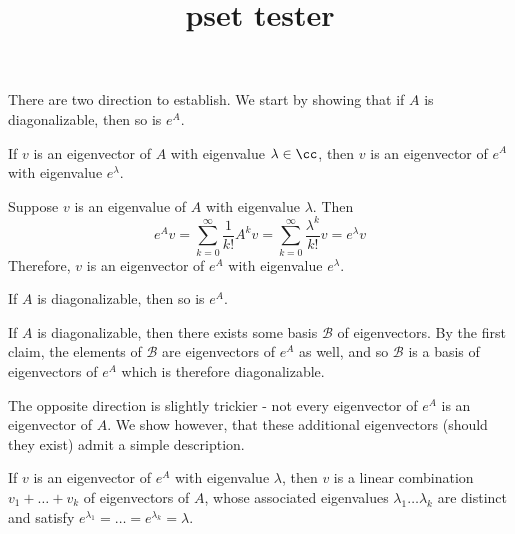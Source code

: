 \documentclass{scrartcl}
\title{pset tester}
\begin{document}
\maketitle


\newpset


\begin{solution} 
        There are two direction to establish. We start by showing that if $A$ is diagonalizable, then so is $e^A$.
        \begin{lemma}
        If $v$ is an eigenvector of $A$ with eigenvalue $\lambda\in \cc$, then $v$ is an eigenvector of $e^A$ with eigenvalue $e^\lambda$.
        \end{lemma}
        \begin{subproof}
        Suppose $v$ is an eigenvalue of $A$ with eigenvalue $\lambda$. Then 
        \[e^Av=\sum_{k=0}^{\infty}\frac{1}{k!}A^kv=\sum_{k=0}^{\infty}\frac{\lambda^k}{k!}v=e^\lambda v\]
        Therefore, $v$ is an eigenvector of $e^A$
         with eigenvalue $e^\lambda$.
         \end{subproof}
        
        \begin{lemma}
        If $A$ is diagonalizable, then so is $e^A$.
        \end{lemma}
        \begin{subproof}
        If $A$ is diagonalizable, then there exists some basis $\mathcal{B}$ of eigenvectors. By the first claim, the elements of $\mathcal{B}$ are eigenvectors of $e^A$ as well, and so $\mathcal{B}$ is a basis of eigenvectors of $e^A$ which is therefore diagonalizable.
        \end{subproof}
        
        The opposite direction is slightly trickier - not every eigenvector of $e^A$ is an eigenvector of $A$. We show however, that these additional eigenvectors (should they exist) admit a simple description. 
        
        \begin{lemma}
        If $v$ is an eigenvector of $e^A$ with eigenvalue $\lambda$, then $v$ is a linear combination $v_1+\dots +v_k$ of eigenvectors of $A$, whose associated eigenvalues $\lambda_1\dots \lambda_k$ are distinct and satisfy $e^{\lambda_1}=\dots=e^{\lambda_k}=\lambda$.
        \end{lemma}
            

\end{solution}
\end{document}
